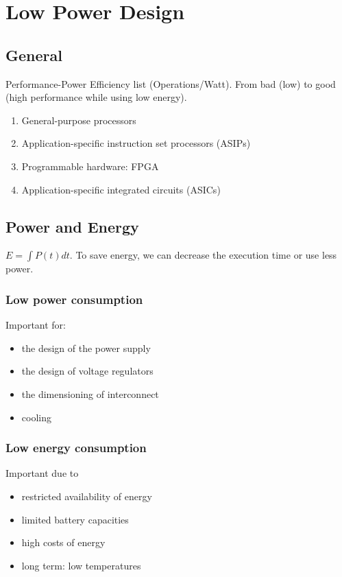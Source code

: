 

\section{Low Power Design}

\subsection{General}
Performance-Power Efficiency list (Operations/Watt). From bad (low) to good (high performance while using low energy).
\begin{enumerate}[noitemsep]
\item General-purpose processors
\item Application-specific instruction set processors (ASIPs) 
\item Programmable hardware: FPGA
\item Application-specific integrated circuits (ASICs)
\end{enumerate}

\subsection{Power and Energy}
\begin{theorem}[Energy]
$E = \int P(t) dt$. To save energy, we can decrease the execution time or use less power.
\end{theorem}

\subsubsection{Low power consumption}
Important for: 
\begin{itemize}[noitemsep]
\item the design of the power supply
\item the design of voltage regulators
\item the dimensioning of interconnect
\item cooling
\end{itemize}

\subsubsection{Low energy consumption}
Important due to 
\begin{itemize}[noitemsep]
\item restricted availability of energy
\item limited battery capacities
\item high costs of energy
\item long term: low temperatures
\end{itemize}

